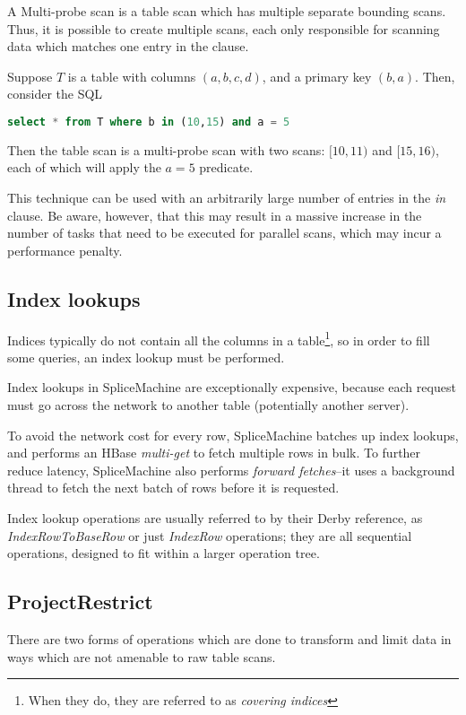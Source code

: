 A Multi-probe scan is a table scan which has multiple separate bounding scans. Thus, it is possible to create multiple scans, each only responsible for scanning data which matches one entry in the clause.

\begin{exmp}
Suppose $T$ is a table with columns $(a,b,c,d)$, and a primary key $(b,a)$. Then, consider the SQL

\begin{lstlisting}[frame=single,captionpos=b,caption=SQL for multiple bounds,language=SQL]
	select * from T where b in (10,15) and a = 5
\end{lstlisting}
Then the table scan is a multi-probe scan with two scans: $[10,11)$ and $[15,16)$, each of which will apply the $a=5$ predicate.
\end{exmp}

This technique can be used with an arbitrarily large number of entries in the \emph{in} clause. Be aware, however, that this may result in a massive increase in the number of tasks that need to be executed for parallel scans, which may incur a performance penalty.

\subsection{Index lookups}
Indices typically do not contain all the columns in a table\footnote{When they do, they are referred to as \emph{covering indices}}, so in order to fill some queries, an index lookup must be performed.

Index lookups in SpliceMachine are exceptionally expensive, because each request must go across the network to another table (potentially another server).

To avoid the network cost for every row, SpliceMachine batches up index lookups, and performs an HBase \emph{multi-get} to fetch multiple rows in bulk. To further reduce latency, SpliceMachine also performs \emph{forward fetches}--it uses a background thread to fetch the next batch of rows before it is requested.

Index lookup operations are usually referred to by their Derby reference, as \emph{IndexRowToBaseRow} or just \emph{IndexRow} operations; they are all sequential operations, designed to fit within a larger operation tree.

\subsection{ProjectRestrict}
There are two forms of operations which are done to transform and limit data in ways which are not amenable to raw table scans.

